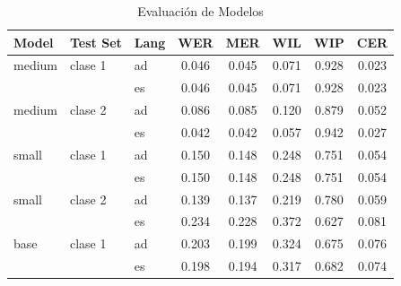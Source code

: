 
\begin{table}[!ht]
\centering
\caption{Evaluación de Modelos }
\begin{tabular}{l l l S[table-format=1.3] S[table-format=1.3] S[table-format=1.3] S[table-format=1.3] S[table-format=1.3]}
\toprule
\textbf{Model} & \textbf{Test Set} & \textbf{Lang} & \textbf{WER} & \textbf{MER} & \textbf{WIL} & \textbf{WIP} & \textbf{CER} \\
\midrule
medium & clase 1 & ad & 0.046 & 0.045 & 0.071 & 0.928 & 0.023 \\
       &               & es & 0.046 & 0.045 & 0.071 & 0.928 & 0.023 \\
\cmidrule(r){1-8}
medium & clase 2 & ad & 0.086 & 0.085 & 0.120 & 0.879 & 0.052 \\
       &               & es & 0.042 & 0.042 & 0.057 & 0.942 & 0.027 \\
\midrule
small  & clase 1 & ad & 0.150 & 0.148 & 0.248 & 0.751 & 0.054 \\
       &               & es & 0.150 & 0.148 & 0.248 & 0.751 & 0.054 \\
\cmidrule(r){1-8}
small  & clase 2 & ad & 0.139 & 0.137 & 0.219 & 0.780 & 0.059 \\
       &               & es & 0.234 & 0.228 & 0.372 & 0.627 & 0.081 \\
\midrule
base   & clase 1 & ad & 0.203 & 0.199 & 0.324 & 0.675 & 0.076 \\
       &               & es & 0.198 & 0.194 & 0.317 & 0.682 & 0.074 \\
\bottomrule
\end{tabular}
\end{table}
